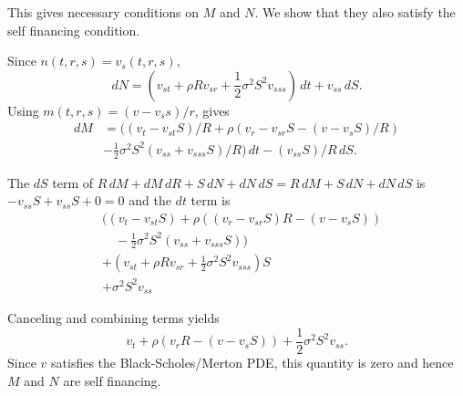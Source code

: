 \documentclass[11pt,letterpaper,fleqn]{article}
\begin{document}
This gives necessary conditions on $M$ and $N$. We show that
they also satisfy the self financing condition.

Since $n(t, r, s) = v_s(t, r, s)$,
\[
dN = (v_{st} + \rho R v_{sr} + \frac{1}{2} \sigma^2 S^2 v_{sss})\,dt
	+ v_{ss}\,dS.
\]
Using $m(t, r, s) = (v - v_s s)/r$, gives
\begin{align*}
dM &= \bigl((v_t - v_{st}S)/R + \rho(v_r - v_{sr}S - (v - v_s S)/R)\\
 &- \frac{1}{2}\sigma^2 S^2(v_{ss} + v_{sss}S)/R\bigr)\,dt - (v_{ss}S)/R\,dS.
\end{align*}

The $dS$ term of $R\,dM + dM\,dR + S\,dN + dN\,dS = R\,dM + S\,dN + dN\,dS$ is 
$-v_{ss}S + v_{ss}S + 0= 0$
and the $dt$ term is
\begin{align*}
&\bigl((v_t - v_{st}S) + \rho((v_r - v_{sr}S)R - (v - v_s S)) \\
&\quad -\frac{1}{2}\sigma^2 S^2(v_{ss} + v_{sss}S)\bigr)\\ 
&+ (v_{st} + \rho R v_{sr} + \frac{1}{2} \sigma^2 S^2 v_{sss})S\\
&+ \sigma^2 S^2 v_{ss}
\end{align*}

Canceling and combining terms yields
\[
v_t + \rho(v_r R - (v - v_s S))
+\frac{1}{2}\sigma^2 S^2v_{ss}.
\]
Since $v$ satisfies the Black-Scholes/Merton PDE, this
quantity is zero and hence $M$ and $N$ are
self financing.


{}
\end{document}
